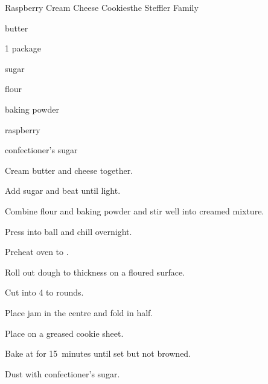 \begin{recipe}{Raspberry Cream Cheese Cookies}{the Steffler Family}{}

\begin{ingredients}
\item {} butter
\item 1 package 
\item \C{\quarter} sugar
\item {} flour
\item \tp{\half} baking powder
\item \C{\half} raspberry 
\item confectioner's sugar
\end{ingredients}

\begin{directions}
\item Cream butter and cheese together.
\item Add sugar and beat until light.
\item Combine flour and baking powder and stir well into creamed mixture.
\item Press into ball and chill overnight.
\item Preheat oven to .
\item Roll out dough to \cm{\half} thickness on a floured surface.
\item Cut into 4 to  rounds.
\item Place \tp{\half} jam in the centre and fold in half.
\item Place on a greased cookie sheet.
\item Bake at  for 15~minutes until set but not browned.
\item Dust with confectioner's sugar.
\end{directions}
\end{recipe}
